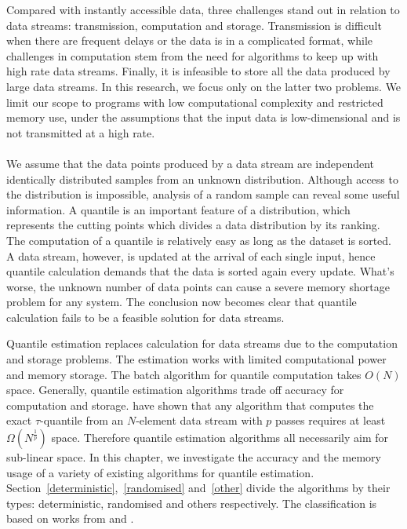 Compared with instantly accessible data, three challenges stand out in relation to data streams: transmission, computation and storage\cite{muthukrishnanDataStreamsAlgorithms2005}.
Transmission is difficult when there are frequent delays or the data is in a complicated format,
while challenges in computation stem from the need for algorithms to keep up with high rate data streams.
Finally, it is infeasible to store all the data produced by large data streams.
In this research, we focus only on the latter two problems. We limit our scope to programs with low computational complexity and restricted memory use, under the assumptions that the input data is low-dimensional and is not transmitted at a high rate.
\\\\
We assume that the data points produced by a data stream are independent identically distributed samples from an unknown distribution. 
Although access to the distribution is impossible, analysis of a random sample can reveal some useful information. 
A quantile is an important feature of a distribution, which represents the cutting points which divides a data distribution by its ranking.
The computation of a quantile is relatively easy as long as the dataset is sorted.
A data stream, however, is updated at the arrival of each single input, hence quantile calculation demands that the data is sorted again every update.
What's worse, the unknown number of data points can cause a severe memory shortage problem for any system. 
The conclusion now becomes clear that quantile calculation fails to be a feasible solution for data streams.

Quantile estimation replaces calculation for data streams due to the computation and storage problems.
The estimation works with limited computational power and memory storage.
The batch algorithm for quantile computation takes $O(N)$ space.
Generally, quantile estimation algorithms trade off accuracy for computation and storage.
\citeauthor{munroSelectionSortingLimited1980} \cite{munroSelectionSortingLimited1980} have shown that any algorithm that computes the exact $\tau$-quantile from an $N$-element data stream with $p$ passes requires at least $\Omega(N^{\frac{1}{p}})$ space.
Therefore quantile estimation algorithms all necessarily aim for sub-linear space.
In this chapter, we investigate the accuracy and the memory usage of a variety of existing algorithms for quantile estimation. Section~\ref{deterministic},~\ref{randomised} and~\ref{other} divide the algorithms by their types: deterministic, randomised and others respectively. The classification is based on works from \citeauthor{buragohainQuantilesStreams2009}\cite{buragohainQuantilesStreams2009} and \citeauthor{wangQuantilesDataStreams2013}\cite{wangQuantilesDataStreams2013}.

